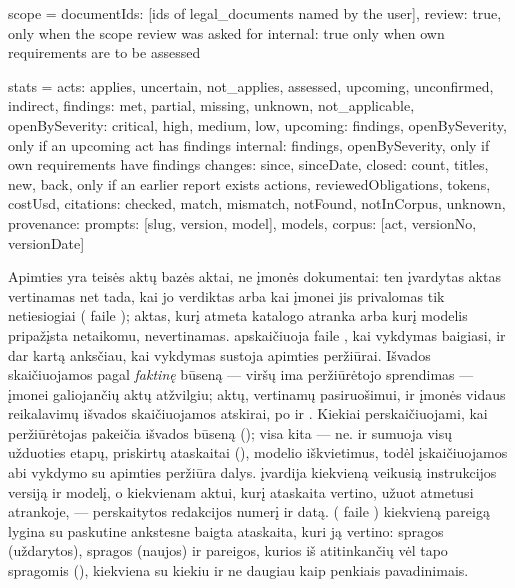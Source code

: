 \begin{codeblock}
scope = {documentIds: [ids of legal_documents named by the user],
         review: true,     only when the scope review was asked for
         internal: true}   only when own requirements are to be assessed

stats = {acts: {applies, uncertain, not_applies,
                assessed, upcoming, unconfirmed, indirect},
         findings: {met, partial, missing, unknown, not_applicable},
         openBySeverity: {critical, high, medium, low},
         upcoming: {findings, openBySeverity},  only if an upcoming act has findings
         internal: {findings, openBySeverity},  only if own requirements have findings
         changes: {since, sinceDate, closed: {count, titles}, new, back},
                                                 only if an earlier report exists
         actions, reviewedObligations, tokens, costUsd,
         citations: {checked, match, mismatch, notFound, notInCorpus, unknown},
         provenance: {prompts: [{slug, version, model}], models,
                      corpus: [{act, versionNo, versionDate}]}}
\end{codeblock}

Apimties  yra teisės aktų bazės aktai, ne įmonės dokumentai: ten įvardytas
aktas vertinamas net tada, kai jo verdiktas  arba kai įmonei jis privalomas
tik netiesiogiai ( faile ); aktas, kurį atmeta
katalogo atranka arba kurį modelis pripažįsta
netaikomu, nevertinamas.  apskaičiuoja  faile
, kai vykdymas baigiasi, ir dar kartą anksčiau, kai vykdymas
sustoja apimties peržiūrai. Išvados skaičiuojamos pagal \emph{faktinę} būseną --- viršų ima
peržiūrėtojo sprendimas --- įmonei galiojančių aktų atžvilgiu; aktų, vertinamų pasiruošimui,
ir įmonės vidaus reikalavimų išvados skaičiuojamos atskirai, po  ir
. Kiekiai perskaičiuojami, kai peržiūrėtojas pakeičia išvados būseną
(); visa kita --- ne.  ir  sumuoja visų
užduoties etapų, priskirtų ataskaitai (), modelio iškvietimus,
todėl įskaičiuojamos abi vykdymo su apimties peržiūra dalys.  įvardija
kiekvieną veikusią instrukcijos versiją ir modelį, o kiekvienam aktui, kurį ataskaita vertino,
užuot atmetusi atrankoje, --- perskaitytos redakcijos numerį ir datą. 
( faile ) kiekvieną pareigą lygina su paskutine
ankstesne baigta ataskaita, kuri ją vertino: spragos  (uždarytos), spragos
 (naujos) ir pareigos, kurios iš atitinkančių vėl tapo spragomis (),
kiekviena su kiekiu ir ne daugiau kaip penkiais pavadinimais.

